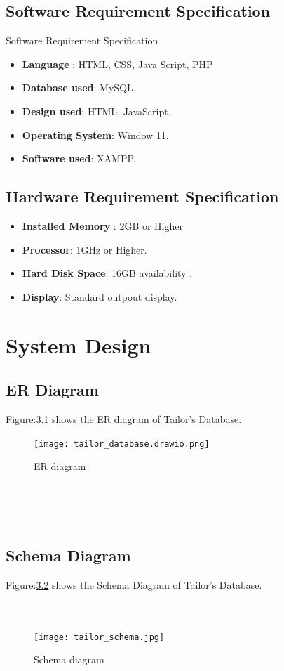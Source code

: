 \documentclass[12pt, letter paper]{report}
\begin{document}
\section{Software Requirement Specification}
Software Requirement Specification
\begin{itemize}
 \item {\textbf{Language} : HTML, CSS, Java Script, PHP}
 \item {\textbf{Database used}: MySQL}.
 \item {\textbf{Design used}: HTML, JavaScript}.
 \item {\textbf{Operating System}: Window 11}.
 \item {\textbf{Software used}: XAMPP}.
\end{itemize}

\section{Hardware Requirement Specification} 

\begin{itemize}
 \item {\textbf{Installed Memory} : 2GB or Higher}
 \item {\textbf{Processor}: 1GHz or Higher}.
 \item {\textbf{Hard Disk Space}: 16GB availability }.
 \item {\textbf{Display}: Standard outpout display}.
 \
\end{itemize}
\chapter{System Design}
\section{ER Diagram} 
Figure:\ref{fig:tailor_database.drawio.png} shows the ER diagram of Tailor's Database.
\begin{figure}[h]
 \centering
 \texttt{[image: tailor\_database.drawio.png]}
 \caption{ER diagram}
 \label{fig:tailor_database.drawio.png}
\end{figure}
\\
\\
\\
\section{Schema Diagram} 
Figure:\ref{fig:tailor_schema.jpg} shows the Schema Diagram of Tailor's Database.
\\
\\
\\
\begin{figure}[h]
 \centering
 \texttt{[image: tailor\_schema.jpg]}
 \caption{Schema diagram}
 \label{fig:tailor_schema.jpg}
\end{figure}
\end{document}

